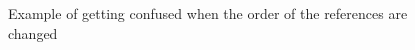 
\begin{figure}[htbp]
    \centering
    \caption{Example of  getting confused when the order of the references are changed}
    \label{app:ReferenceBiasExample1}
\end{figure}

